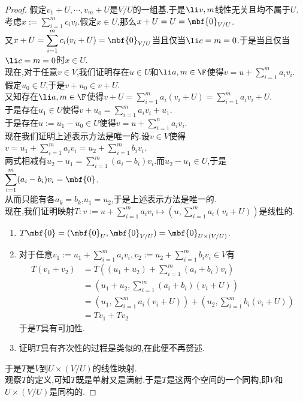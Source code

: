 \documentclass{ctexart}
\begin{document}
\begin{proof}
    假定$v_1+U,\cdots,v_m+U$是$V/U$的一组基.于是$\li v,m$线性无关且均不属于$U$.\\
    考虑$\displaystyle x:=\sum_{i=1}^{m}c_iv_i$.假定$x\in U$,那么$x+U=U=\mbf{0}_{V/U}$.\\
    又$\displaystyle x+U=\sum_{i=1}^{m}c_i(v_i+U)=\mbf{0}_{V/U}$当且仅当$\li c=m=0$.于是当且仅当$\li c=m=0$时$x\in U$.\\
    现在,对于任意$v\in V$,我们证明存在$u\in U$和$\li a,m\in\F$使得$\displaystyle v=u+\sum_{i=1}^{m}a_iv_i$.\\
    假定$u_0\in U$,于是$v+u_0\in v+U$.\\
    又知存在$\li a,m\in\F$使得$\displaystyle v+U=\sum_{i=1}^{m}a_i(v_i+U)=\sum_{i=1}^{m}a_iv_i+U$.\\
    于是存在$u_1\in U$使得$\displaystyle v+u_0=\sum_{i=1}^{m}a_iv_i+u_1$.\\
    于是存在$u:=u_1-u_0\in U$使得$\displaystyle v=u+\sum_{i=1}^{n}a_iv_i$.\\
    现在我们证明上述表示方法是唯一的.设$v\in V$使得$\displaystyle v=u_1+\sum_{i=1}^{m}a_iv_i=u_2+\sum_{i=1}^{m}b_iv_i$.\\
    两式相减有$\displaystyle u_2-u_1=\sum_{i=1}^{m}(a_i-b_i)v_i$.而$u_2-u_1\in U$,于是$\displaystyle\sum_{i=1}^{m}(a_i-b_i)v_i=\mbf{0}$.\\
    从而只能有各$a_k=b_k$,$u_1=u_2$,于是上述表示方法是唯一的.\\
    现在,我们证明映射$\displaystyle T:v:=u+\sum_{i=1}^{m}a_iv_i\mapsto \left(u,\sum_{i=1}^{m}a_i(v_i+U)\right)$是线性的.
    \begin{enumerate}[label=\tbf{(\alph*)}]
        \item $T\mbf{0}=(\mbf{0}_U,\mbf{0}_{V/U})=\mbf{0}_{U\times(V/U)}$.
        \item 对于任意$\displaystyle v_1:=u_1+\sum_{i=1}^{m}a_iv_i,v_2:=u_2+\sum_{i=1}^{m}b_iv_i\in V$有
            $$\begin{aligned}
                T(v_1+v_2)
                &= T((u_1+u_2)+\sum_{i=1}^m(a_i+b_i)v_i) \\
                &= \left(u_1+u_2,\sum_{i=1}^{m}(a_i+b_i)(v_i+U)\right) \\
                &= \left(u_1,\sum_{i=1}^{m}a_i(v_i+U)\right)+\left(u_2,\sum_{i=1}^{m}b_i(v_i+U)\right) \\
                &= Tv_1+Tv_2
            \end{aligned}$$
            于是$T$具有可加性.
        \item 证明$T$具有齐次性的过程是类似的,在此便不再赘述.
    \end{enumerate}
    于是$T$是$V$到$U\times(V/U)$的线性映射.\\
    观察$T$的定义,可知$T$既是单射又是满射.于是$T$是这两个空间的一个同构,即$V$和$U\times(V/U)$是同构的.
\end{proof}
\end{document}
